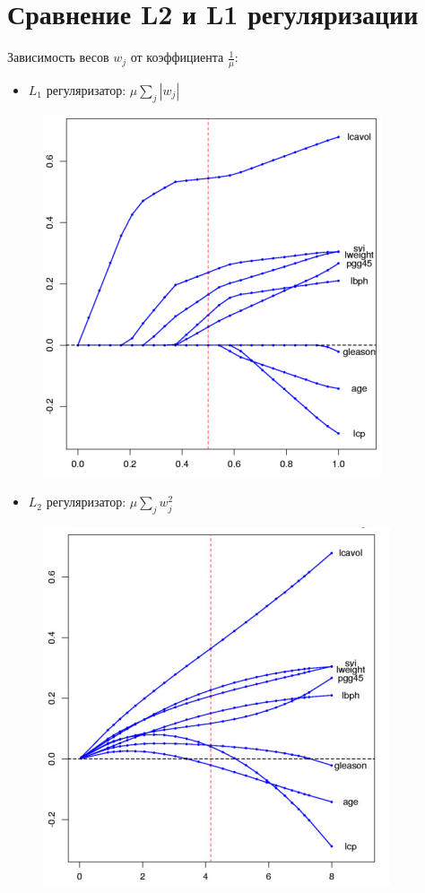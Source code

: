 \vspace{10pt}

\section{Сравнение L2 и L1 регуляризации}

Зависимость весов \(w_j\) от коэффициента \(\frac{1}{\mu}\):

\begin{itemize}
    \item \(L_1\) регуляризатор: \(\mu \sum_{j} |w_j|\)
\end{itemize}

\begin{figure}[ht]
    \centering
    \includegraphics[width=0.6 \linewidth]{chapters/svm/images/L_1.png}
    \label{fig:image_1}
\end{figure}

\begin{itemize}
    \item \(L_2\) регуляризатор: \(\mu \sum_{j} w_j^2\)
\end{itemize}

\begin{figure}[ht]
    \centering
    \includegraphics[width=0.6 \linewidth]{chapters/svm/images/L_2.png}
    \label{fig:image_2}
\end{figure}

